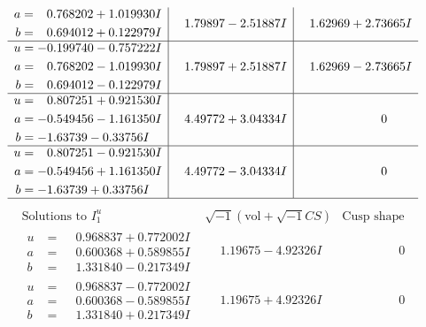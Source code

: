 \documentclass[1p]{elsarticle_modified}
\theoremstyle{definition}
\newcommand{\I}{\sqrt{-1}}
\begin{document}
$$\begin{array}{c|c|c}
\begin{aligned}
a &= \phantom{-}0.768202 + 1.019930 I \\
b &= \phantom{-}0.694012 + 0.122979 I\end{aligned}
 & \phantom{-}1.79897 - 2.51887 I & \phantom{-}1.62969 + 2.73665 I \\ \hline\begin{aligned}
u &= -0.199740 - 0.757222 I \\
a &= \phantom{-}0.768202 - 1.019930 I \\
b &= \phantom{-}0.694012 - 0.122979 I\end{aligned}
 & \phantom{-}1.79897 + 2.51887 I & \phantom{-}1.62969 - 2.73665 I \\ \hline\begin{aligned}
u &= \phantom{-}0.807251 + 0.921530 I \\
a &= -0.549456 - 1.161350 I \\
b &= -1.63739 - 0.33756 I\end{aligned}
 & \phantom{-}4.49772 + 3.04334 I & \phantom{-0.000000 } 0 \\ \hline\begin{aligned}
u &= \phantom{-}0.807251 - 0.921530 I \\
a &= -0.549456 + 1.161350 I \\
b &= -1.63739 + 0.33756 I\end{aligned}
 & \phantom{-}4.49772 - 3.04334 I & \phantom{-0.000000 } 0\\
 \hline 
 \end{array}$$\newpage$$\begin{array}{c|c|c}  
\text{Solutions to }I^u_{1}& \I (\text{vol} + \sqrt{-1}CS) & \text{Cusp shape}\\
 \hline 
\begin{aligned}
u &= \phantom{-}0.968837 + 0.772002 I \\
a &= \phantom{-}0.600368 + 0.589855 I \\
b &= \phantom{-}1.331840 - 0.217349 I\end{aligned}
 & \phantom{-}1.19675 - 4.92326 I & \phantom{-0.000000 } 0 \\ \hline\begin{aligned}
u &= \phantom{-}0.968837 - 0.772002 I \\
a &= \phantom{-}0.600368 - 0.589855 I \\
b &= \phantom{-}1.331840 + 0.217349 I\end{aligned}
 & \phantom{-}1.19675 + 4.92326 I & \phantom{-0.000000 } 0 \\ \hline\begin{aligned}

\end{aligned}
\end{array}$$
\end{document}
